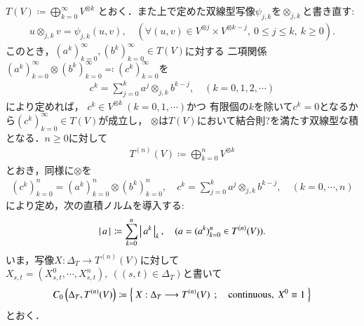 	$T(V) \coloneqq \bigoplus_{k=0}^{\infty} V^{\otimes k}$
	とおく．また上で定めた双線型写像$\psi_{j,k}$を$\otimes_{j,k}$と書き直す:
	\begin{align}
		u \otimes_{j,k} v = \psi_{j,k}(u,v),
		\quad (\forall (u,v) \in V^{\otimes j} \times V^{\otimes k-j},\ 0 \leq j \leq k,\ k \geq 0).
		\label{eq:def_of_otimes_for_completion_V_tensor_k}
	\end{align}
	このとき，$(a^k)_{k=0}^{\infty},(b^k)_{k=0}^{\infty} \in T(V)$に対する
	二項関係$(a^k)_{k=0}^{\infty} \otimes (b^k)_{k=0}^{\infty} \eqqcolon (c^k)_{k=0}^{\infty}$を
	\begin{align}
		c^k = \sum_{j=0}^{k} a^j \otimes_{j,k} b^{k-j},
		\quad (k=0,1,2,\cdots)
	\end{align}
	により定めれば，
	$c^k \in V^{\otimes k}\ (k=0,1,\cdots)$かつ
	有限個の$k$を除いて$c^k = 0$となるから$(c^k)_{k=0}^\infty \in T(V)$が成立し，
	$\otimes$は$T(V)$において結合則?を満たす双線型な積となる．$n \geq 0$に対して
	\begin{align}
		T^{(n)}(V) \coloneqq \bigoplus_{k=0}^{n} V^{\otimes k}
	\end{align}
	とおき，同様に$\otimes$を
	\begin{align}
		(c^k)_{k=0}^n = (a^k)_{k=0}^n \otimes (b^k)_{k=0}^n,
		\quad c^k = \sum_{j=0}^{k} a^j \otimes_{j,k} b^{k-j},
		\quad (k=0,\cdots,n)
	\end{align}
	により定め，次の直積ノルムを導入する:
	\begin{align}
		\left|\, a\, \right|_{} \coloneqq \sum_{k=0}^n \left|\, a^k\, \right|_{k},
		\quad (a = (a^k)_{k=0}^n \in T^{(n)}(V)).
		\label{eq:def_norm_on_truncated_tensor_algebra}
	\end{align}
	いま，写像$X:\Delta_T \longrightarrow T^{(n)}(V)$に対して
	$X_{s,t} = (X^0_{s,t},\cdots,X^n_{s,t}),\ ((s,t) \in \Delta_T)$と書いて
	\begin{align}
		C_0 \left(\Delta_T,T^{(n)}(V) \right)
		\coloneqq \left\{\ X:\Delta_T \longrightarrow T^{(n)}(V)\ \, ; \quad \mbox{continuous},\ X^0 \equiv 1\ \right\}
	\end{align}
	とおく．
	
